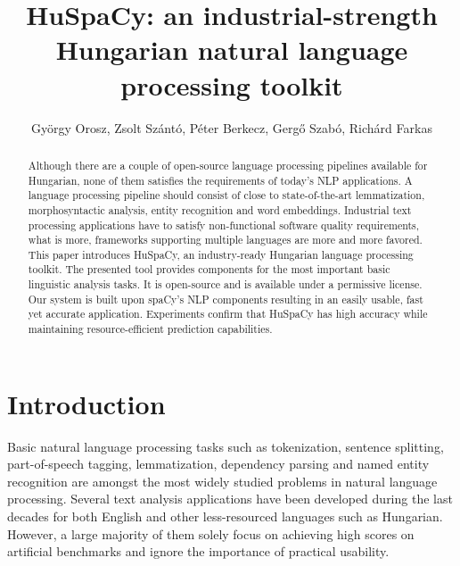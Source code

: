 \documentclass{llncs}
\newcommand{\huspacy}{HuSpaCy}
\begin{document}
\pagestyle{myheadings}
\def\leftmark{{\rm XVIII. Magyar Sz\'am\'\i t\'og\'epes Nyelv\'eszeti Konferencia}}
\def\rightmark{{\rm Szeged, 2022. január 27-28.}}


\title{\huspacy: an industrial-strength Hungarian natural language processing toolkit}

\author{
György Orosz,
Zsolt Szántó, \break
Péter Berkecz,
Gergő Szabó,
Richárd Farkas\\
\break
{}\break
}

\maketitle

\begin{abstract}
Although there are a couple of open-source language processing pipelines available for Hungarian, none of them satisfies the requirements of today’s NLP applications. 
A language processing pipeline should consist of close to state-of-the-art lemmatization, morphosyntactic analysis, entity recognition and word embeddings. 
Industrial text processing applications have to satisfy non-functional software quality requirements, what is more, frameworks supporting multiple languages are more and more favored.
This paper introduces \huspacy, an industry-ready Hungarian language processing toolkit. 
The presented tool provides components for the most important basic linguistic analysis tasks. It is open-source and is available under a permissive license. 
Our system is built upon spaCy’s NLP components resulting in an easily usable, fast yet accurate application.
Experiments confirm that HuSpaCy has high accuracy while maintaining resource-efficient prediction capabilities. 
\end{abstract}

\section{Introduction}

Basic natural language processing tasks such as tokenization, sentence splitting, part-of-speech tagging, lemmatization, dependency parsing and named entity recognition are amongst the most widely studied problems in natural language processing. Several text analysis applications have been developed during the last decades for both English and other less-resourced languages such as Hungarian. However, a large majority of them solely focus on achieving high scores on artificial benchmarks and ignore the importance of practical usability.
\end{document}
